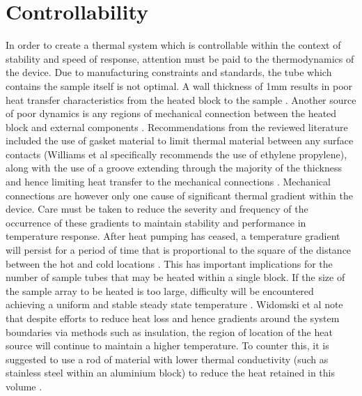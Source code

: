 \section{Controllability}
In order to create a thermal system which is controllable within the context of stability and speed of response, attention must be paid to the thermodynamics of the device. Due to manufacturing constraints and standards, the tube which contains the sample itself is not optimal. A wall thickness of 1mm results in poor heat transfer characteristics from the heated block to the sample \cite{1704922}. Another source of poor dynamics is any regions of mechanical connection between the heated block and external components \cite{7238517}. Recommendations from the reviewed literature included the use of gasket material to limit thermal material between any surface contacts (Williams et al specifically recommends the use of ethylene propylene), along with the use of a groove extending through the majority of the thickness and hence limiting heat transfer to the mechanical connections \cite{20130415930883}\cite{20070113880}. Mechanical connections are however only one cause of significant thermal gradient within the device. Care must be taken to reduce the severity and frequency of the occurrence of these gradients to maintain stability and performance in temperature response. After heat pumping has ceased, a temperature gradient will persist for a period of time that is proportional to the square of the distance between the hot and cold locations \cite{7238517}. This has important implications for the number of sample tubes that may be heated within a single block. If the size of the sample array to be heated is too large, difficulty will be encountered achieving a uniform and stable steady state temperature \cite{7238517}. Widomski et al note that despite efforts to reduce heat loss and hence gradients around the system boundaries via methods such as insulation, the region of location of the heat source will continue to maintain a higher temperature. To counter this, it is suggested to use a rod of material with lower thermal conductivity (such as stainless steel within an aluminium block) to reduce the heat retained in this volume \cite{20070113880}.\\

